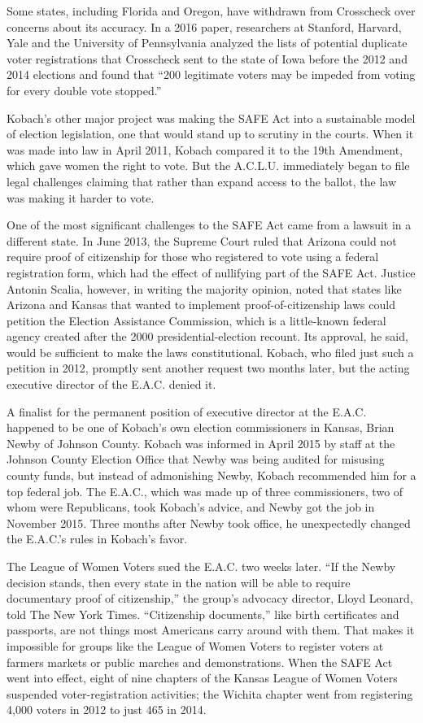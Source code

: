 Some states, including Florida and Oregon, have withdrawn from
Crosscheck over concerns about its accuracy. In a 2016 paper,
researchers at Stanford, Harvard, Yale and the University of
Pennsylvania analyzed the lists of potential duplicate voter
registrations that Crosscheck sent to the state of Iowa before the 2012
and 2014 elections and found that ``200 legitimate voters may be impeded
from voting for every double vote stopped.''

Kobach's other major project was making the SAFE Act into a sustainable
model of election legislation, one that would stand up to scrutiny in
the courts. When it was made into law in April 2011, Kobach compared it
to the 19th Amendment, which gave women the right to vote. But the
A.C.L.U. immediately began to file legal challenges claiming that rather
than expand access to the ballot, the law was making it harder to vote.

One of the most significant challenges to the SAFE Act came from a
lawsuit in a different state. In June 2013, the Supreme Court ruled that
Arizona could not require proof of citizenship for those who registered
to vote using a federal registration form, which had the effect of
nullifying part of the SAFE Act. Justice Antonin Scalia, however, in
writing the majority opinion, noted that states like Arizona and Kansas
that wanted to implement proof-of-citizenship laws could petition the
Election Assistance Commission, which is a little-known federal agency
created after the 2000 presidential-election recount. Its approval, he
said, would be sufficient to make the laws constitutional. Kobach, who
filed just such a petition in 2012, promptly sent another request two
months later, but the acting executive director of the E.A.C. denied it.

A finalist for the permanent position of executive director at the
E.A.C. happened to be one of Kobach's own election commissioners in
Kansas, Brian Newby of Johnson County. Kobach was informed in April 2015
by staff at the Johnson County Election Office that Newby was being
audited for misusing county funds, but instead of admonishing Newby,
Kobach recommended him for a top federal job. The E.A.C., which was made
up of three commissioners, two of whom were Republicans, took Kobach's
advice, and Newby got the job in November 2015. Three months after Newby
took office, he unexpectedly changed the E.A.C.'s rules in Kobach's
favor.

The League of Women Voters sued the E.A.C. two weeks later. ``If the
Newby decision stands, then every state in the nation will be able to
require documentary proof of citizenship,'' the group's advocacy
director, Lloyd Leonard, told The New York Times. ``Citizenship
documents,'' like birth certificates and passports, are not things most
Americans carry around with them. That makes it impossible for groups
like the League of Women Voters to register voters at farmers markets or
public marches and demonstrations. When the SAFE Act went into effect,
eight of nine chapters of the Kansas League of Women Voters suspended
voter-registration activities; the Wichita chapter went from registering
4,000 voters in 2012 to just 465 in 2014.

